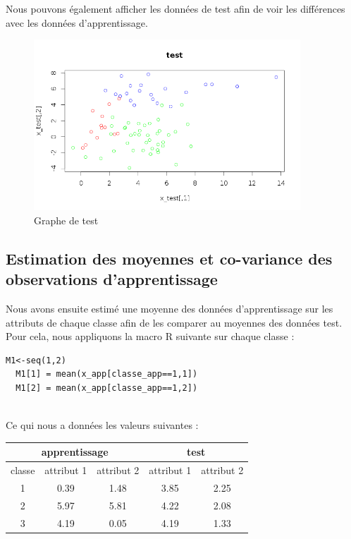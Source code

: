 \documentclass[a4paper,11pt]{article}
\begin{document}
  Nous pouvons également afficher les données de test afin de voir les différences avec les données d'apprentissage.
  \newpage
  \begin{figure}[h]
   \center
   \includegraphics[width=10cm]{ensemble_test.png}
   \caption{Graphe de test}
  \end{figure}
   
  \subsection{Estimation des moyennes et co-variance des observations d'apprentissage}
  Nous avons ensuite estimé une moyenne des données d'apprentissage sur les attributs de chaque classe afin de les
  comparer au moyennes des données test. Pour cela, nous appliquons la macro R suivante sur chaque classe :
  
  \begin{lstlisting}[caption=Estimation de la moyenne pour la classe d'apprentissage 1]
  M1<-seq(1,2)
  M1[1] = mean(x_app[classe_app==1,1])
  M1[2] = mean(x_app[classe_app==1,2])
  \end{lstlisting}
  \ \\
  Ce qui nous a données les valeurs suivantes :\\
  
  \begin{center}
    \begin{tabular}{|c|c|c|c|c|}
    \hline
    \multicolumn{3}{|c|}{apprentissage} & \multicolumn{2}{c|}{test}\\
    \hline
    classe & attribut 1 & attribut 2 & attribut 1 & attribut 2\\
    \hline
    1 & 0.39 & 1.48 & 3.85 & 2.25\\
    \hline
    2 & 5.97 & 5.81 & 4.22 & 2.08\\
    \hline
    3 & 4.19 & 0.05 & 4.19 & 1.33\\
    \hline
    \end{tabular}
  \end{center}
  
\end{document}
